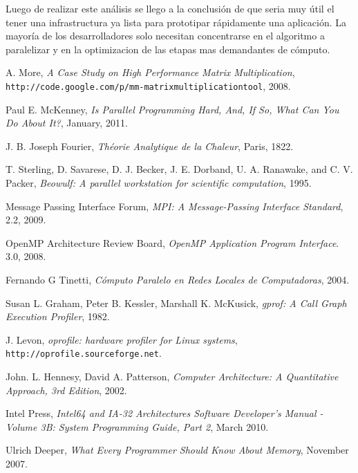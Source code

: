 \documentclass[a4paper]{report}
\begin{document}
Luego de realizar este an\'alisis se llego a la conclusi\'on de que seria muy \'util
el tener una infrastructura ya lista para prototipar r\'apidamente una aplicaci\'on.
La mayor\'ia de los desarrolladores solo necesitan concentrarse en el algoritmo a
paralelizar y en la optimizacion de las etapas mas demandantes de c\'omputo.

\begin{thebibliography}{9}

  A. More,
  \emph{A Case Study on High Performance Matrix Multiplication},
  {\tt http://code.google.com/p/mm-matrixmultiplicationtool},
  2008.

  Paul E. McKenney,
  \emph{Is Parallel Programming Hard, And, If So, What Can You Do About It?},
  January, 2011.

  J. B. Joseph Fourier, \emph{Th\'eorie Analytique de la Chaleur}, Paris, 1822.

  T. Sterling, D. Savarese, D. J. Becker, J. E. Dorband, U. A. Ranawake,
  and C. V. Packer,
  \emph{Beowulf: A parallel workstation for scientific computation},
  1995.

  Message Passing Interface Forum,
  \emph{MPI: A Message-Passing Interface Standard},
  2.2,
  2009.

  OpenMP Architecture Review Board,
  \emph{OpenMP Application Program Interface}.
  3.0,
  2008.

  Fernando G Tinetti,
  \emph{C\'omputo Paralelo en Redes Locales de Computadoras},
  2004.

  Susan L. Graham,  Peter B. Kessler,  Marshall K. McKusick,
  \emph{gprof: A Call Graph Execution Profiler},
  1982.
  
  J. Levon,
  \emph{oprofile: hardware profiler for Linux systems},
       {\tt http://oprofile.sourceforge.net}.
  
  John. L. Hennesy, David A. Patterson,
  \emph{Computer Architecture: A Quantitative Approach, 3rd Edition},
  2002.

  Intel Press,
  \emph{Intel64 and IA-32 Architectures Software Developer's Manual - Volume
    3B: System Programming Guide, Part 2},
  March 2010.

  Ulrich Deeper,
  \emph{What Every Programmer Should Know About Memory},
  November 2007.


\end{thebibliography}
\end{document}
